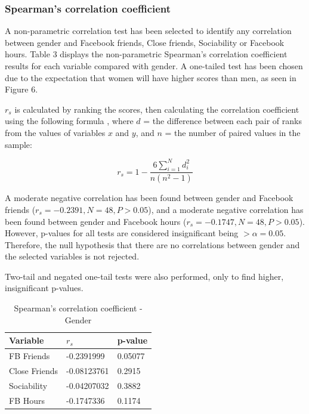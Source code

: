 \subsubsection{Spearman's correlation coefficient}

A non-parametric correlation test has been selected to identify any correlation between gender and Facebook friends, Close friends, Sociability or Facebook hours. Table 3 displays the non-parametric Spearman's correlation coefficient results for each variable compared with gender. A one-tailed test has been chosen due to the expectation that women will have higher scores than men, as seen in Figure 6. 

$r_s$ is calculated by ranking the scores, then calculating the correlation coefficient using the following formula \citep[p. 359]{Gauthier2001}, where $d$ = the difference between each pair of ranks from the values of variables $x$ and $y$, and $n$ = the number of paired values in the sample:

$$r_s = 1 - \frac{6\sum_{i=1}^Nd_i^2}{n(n^2-1)}$$\linebreak

A moderate negative correlation has been found between gender and Facebook friends ($r_s = -0.2391, N = 48, P > 0.05$), and a moderate negative correlation has been found between gender and Facebook hours ($r_s = -0.1747, N = 48, P > 0.05$). However, p-values for all tests are considered insignificant  being $> \alpha = 0.05$. Therefore, the null hypothesis that there are no correlations between gender and the selected variables is not rejected.



Two-tail and negated one-tail tests were also performed, only to find higher, insignificant p-values.

\begin{table}[H]
\centering
\caption{Spearman's correlation coefficient - Gender}
\begin{tabular}{l|l|l}
Variable      & $r_s$      & p-value \\ \hline
FB Friends    & -0.2391999  & 0.05077 \\ \hline
Close Friends & -0.08123761 & 0.2915  \\ \hline
Sociability   & -0.04207032 & 0.3882  \\ \hline
FB Hours      & -0.1747336  & 0.1174  \\ \hline
\end{tabular}
\end{table}


